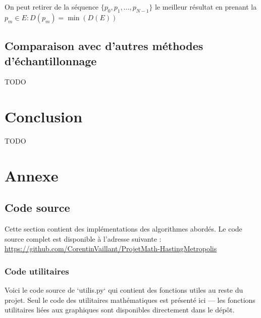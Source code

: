 \documentclass{article}
\begin{document}
On peut retirer de la séquence $\{p_0,p_1, \ldots ,p_{N-1}\}$ le meilleur résultat en prenant la $p_{m} \in E : D(p_{m}) = \min(D(E))$ 


\subsection{Comparaison avec d'autres méthodes d'échantillonnage}

TODO \\

\newpage
\section{Conclusion}

TODO \\

\newpage
\section{Annexe}

\subsection{Code source}

Cette section contient des implémentations des algorithmes abordés. Le code source complet est disponible à l’adresse suivante : \url{https://github.com/CorentinVaillant/ProjetMath-HastingMetropolis}

\subsubsection{Code utilitaires}

Voici le code source de `utilis.py` qui contient des fonctions utiles au reste du projet. Seul le code des utilitaires mathématiques est présenté ici — les fonctions utilitaires liées aux graphiques sont disponibles directement dans le dépôt.
\end{document}
